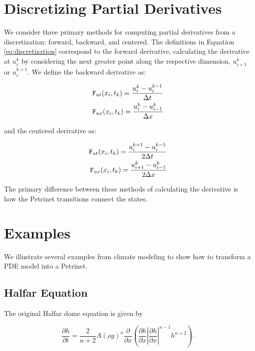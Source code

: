 \documentclass{article}
\begin{document}
\section{Discretizing Partial Derivatives}

We consider three primary methods for computing partial derivatives from a
discretization: forward, backward, and centered.  The definitions in Equation
\ref{eq:discretization} correspond to the forward derivative, calculating the
derivative at $u_i^k$ by considering the next greater point along the respective
dimension, $u_{i+1}^k$ or $u_i^{k+1}$.  We define the backward derivative as:

\begin{equation} \label{eq:discretization-backward}
    \begin{split}
        {\tt F}_{ut}(x_i,t_k)= \dfrac{u_i^{k}-u_i^{k-1}}{\Delta t}\\
        {\tt F}_{ux}(x_i,t_k) = \dfrac{u_{i}^k-u_{i-1}^k}{\Delta x}
    \end{split}
\end{equation}

\noindent and the centered derivative as:

\begin{equation} \label{eq:discretization-centered}
    \begin{split}
        {\tt F}_{ut}(x_i,t_k)= \dfrac{u_i^{k+1}-u_i^{k-1}}{2\Delta t}\\
        {\tt F}_{ux}(x_i,t_k) = \dfrac{u_{i+1}^k-u_{i-1}^k}{2\Delta x}
    \end{split}
\end{equation}

\noindent The primary difference between these methods of calculating the
derivative is how the Petrinet transitions connect the states.

\section{Examples}

We illustrate several examples from climate modeling to show how to transform a
PDE model into a Petrinet.

\subsection{Halfar Equation}

The original Halfar dome equation is given by

\begin{equation}\label{eq:halfar-original}\dfrac{\partial h}{\partial t} = \dfrac{2}{n+2}A(\rho g)^n \dfrac{\partial}{\partial x} \left(\dfrac{\partial h}{\partial x}\left|\dfrac{\partial h}{\partial x}\right|^{n-1} h^{n+2}\right).\end{equation}
\end{document}
